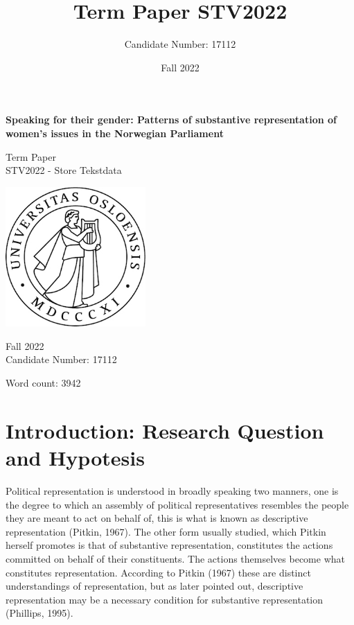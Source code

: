 \documentclass[12pt]{article}
\title{Term Paper STV2022}
\author{Candidate Number: 17112}
\date{Fall 2022}
\begin{document}
\pagestyle{fancy}
	\lfoot{ }
	\cfoot{\thepage}
	\rfoot{ }
	\setlength{\headheight}{15pt}
	

	\begin{titlepage}
		\begin{center}
			\vspace{1cm}
			
			\Huge
			\textbf{Speaking for their gender: Patterns of substantive representation of women's issues in the Norwegian Parliament}
			
			\Large
			Term Paper \\
			STV2022 - Store Tekstdata 
			
			\vspace{2cm}
			\includegraphics[width=0.4\textwidth]{1245071}
			
			\Large
			Fall 2022 \\
			Candidate Number: 17112
			
			\vspace{2cm}
			Word count: 3942
			
		\end{center}
	\end{titlepage}
	
	\section{Introduction: Research Question and Hypotesis}
	
	Political representation is understood in broadly speaking two manners, one is the degree to which an assembly of political representatives resembles the people they are meant to act on behalf of, this is what is known as descriptive representation (Pitkin, 1967). The other form usually studied, which Pitkin herself promotes is that of substantive representation, constitutes the actions committed on behalf of their constituents. The actions themselves become what constitutes representation. According to Pitkin (1967) these are distinct understandings of representation, but as later pointed out, descriptive representation may be a necessary condition for substantive representation (Phillips, 1995).
	
\end{document}
